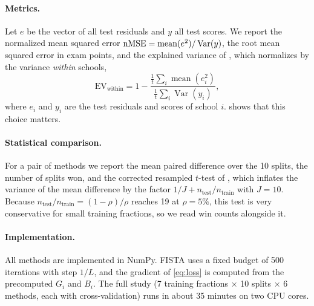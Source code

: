 \paragraph{Metrics.}
Let $e$ be the vector of all test residuals and $y$ all test scores. We report the normalized mean squared error $\mathrm{nMSE} = \operatorname{mean}(e^2) / \operatorname{Var}(y)$, the root mean squared error in exam points, and the explained variance of \citet{argyriou2008convex}, which normalizes by the variance \emph{within} schools,
\begin{equation}
  \mathrm{EV}_{\mathrm{within}} = 1 - \frac{\tfrac{1}{t}\sum_i \operatorname{mean}(e_i^2)}{\tfrac{1}{t}\sum_i \operatorname{Var}(y_i)} ,
  \label{eq:ev}
\end{equation}
where $e_i$ and $y_i$ are the test residuals and scores of school $i$.  shows that this choice matters.

\paragraph{Statistical comparison.}
For a pair of methods we report the mean paired difference over the 10 splits, the number of splits won, and the corrected resampled $t$-test of \citet{nadeau2003inference}, which inflates the variance of the mean difference by the factor $1/J + n_{\text{test}}/n_{\text{train}}$ with $J = 10$. Because $n_{\text{test}}/n_{\text{train}} = (1 - \rho)/\rho$ reaches 19 at $\rho = 5\%$, this test is very conservative for small training fractions, so we read win counts alongside it.

\paragraph{Implementation.}
All methods are implemented in NumPy. FISTA uses a fixed budget of 500 iterations with step $1/L$, and the gradient of \eqref{eq:loss} is computed from the precomputed $G_i$ and $B_i$. The full study (7 training fractions $\times$ 10 splits $\times$ 6 methods, each with cross-validation) runs in about 35 minutes on two CPU cores.
